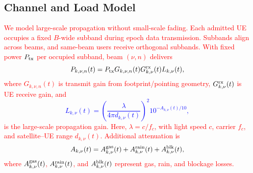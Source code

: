 \documentclass[10pt,letterpaper,journal]{IEEEtran}
\newcommand{\revnew}[1]{\textcolor{red}{#1}}
\begin{document}
\subsection{Channel and Load Model}
\label{subsec:link}

\textcolor{blue}{
\revnew{We model large-scale propagation without small-scale fading. Each admitted UE occupies a fixed $B$-wide subband during epoch data transmission. Subbands align across beams, and same-beam users receive orthogonal subbands. With fixed power $P_{\rm tx}$ per occupied subband, beam $(\nu,n)$ delivers}
\begin{equation}
P_{k,\nu,n}(t)
=P_{\rm tx}G_{k,\nu,n}(t)G^{\rm rx}_{k,\nu}(t)
L_{k,\nu}(t),
\label{eq:received_power}
\end{equation}
\revnew{where $G_{k,\nu,n}(t)$ is transmit gain from footprint/pointing geometry, $G^{\rm rx}_{k,\nu}(t)$ is UE receive gain, and}
\begin{equation}
L_{k,\nu}(t)
=
\left(\frac{\lambda}{4\pi d_{k,\nu}(t)}\right)^2
10^{-A_{k,\nu}(t)/10},
\label{eq:large_scale_gain}
\end{equation}
\revnew{is the large-scale propagation gain. Here, $\lambda=c/f_c$, with light speed $c$, carrier $f_c$, and satellite--UE range $d_{k,\nu}(t)$. Additional attenuation is}
\begin{equation}
A_{k,\nu}(t)
=A^{\rm gas}_{k,\nu}(t)+A^{\rm rain}_{k,\nu}(t)
+A^{\rm blk}_{k,\nu}(t),
\label{eq:additional_attenuation}
\end{equation}
\revnew{where $A^{\rm gas}_{k,\nu}(t)$, $A^{\rm rain}_{k,\nu}(t)$, and $A^{\rm blk}_{k,\nu}(t)$ represent gas, rain, and blockage losses.} 
}
\end{document}
